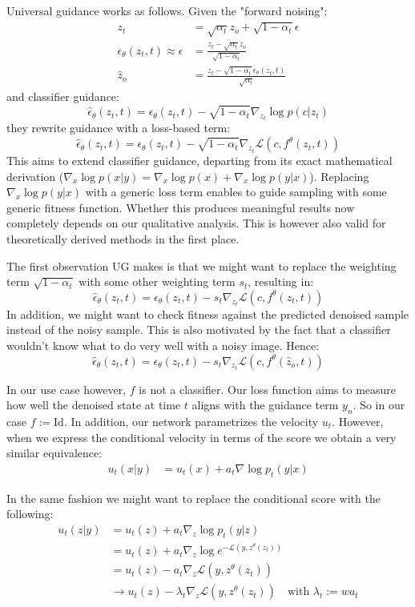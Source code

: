 \documentclass[a4paper,12pt]{article}
\begin{document}
Universal guidance works as follows.
Given the "forward noising":
\begin{align*}
    z_t &= \sqrt{\alpha_t} z_o + \sqrt{1-\alpha_t}\epsilon \\
    \epsilon_\theta(z_t, t) \approx \epsilon &= \frac{z_t - \sqrt{\alpha_t}z_o}{\sqrt{1-\alpha_t}}
    \\
    \hat{z}_o &= \frac{z_t - \sqrt{1-\alpha_t}\epsilon_\theta(z_t, t)}{\sqrt{\alpha_t}} 
\end{align*}
and classifier guidance:
$$
\hat{\epsilon}_\theta(z_t, t) = \epsilon_\theta(z_t, t) - \sqrt{1-\alpha_t}\nabla_{z_t}\log p(c|z_t)
$$
they rewrite guidance with a loss-based term:
$$
\hat{\epsilon}_\theta(z_t, t) = \epsilon_\theta(z_t, t) - \sqrt{1-\alpha_t}\nabla_{z_t}\mathcal{L}(c, f^\theta(z_t, t))
$$
This aims to extend classifier guidance, departing from its exact mathematical derivation ($\nabla_x \log p(x|y) = \nabla_x \log p(x) + \nabla_x \log p(y|x)$).
Replacing $\nabla_x \log p(y|x)$ with a generic loss term enables to guide sampling with some generic fitness function. Whether this produces meaningful results now completely depends on our qualitative analysis. This is however also valid for theoretically derived methods in the first place. 

The first observation UG makes is that we might want to replace the weighting term $\sqrt{1-\alpha_t}$ with some other weighting term $s_t$, resulting in:
$$
\hat{\epsilon}_\theta(z_t, t) = \epsilon_\theta(z_t, t) - s_t\nabla_{z_t}\mathcal{L}(c, f^\theta(z_t, t))
$$
In addition, we might want to check fitness against the predicted denoised sample instead of the noisy sample. This is also motivated by the fact that a classifier wouldn't know what to do very well with a noisy image.
Hence:
$$
\hat{\epsilon}_\theta(z_t, t) = \epsilon_\theta(z_t, t) - s_t\nabla_{z_t}\mathcal{L}(c, f^\theta(\hat{z}_o, t))
$$

In our use case however, $f$ is not a classifier. Our loss function aims to measure how well the denoised state at time $t$ aligns with the guidance term $y_n$. So in our case $f:=\text{Id}$. In addition, our network parametrizes the velocity $u_t$. However, when we express the conditional velocity in terms of the score we obtain a very similar equivalence:
\begin{align*}
    u_t(x|y) &=  u_t(x) + a_t \nabla \log p_t(y|x)
\end{align*}

In the same fashion we might want to replace the conditional score with the following:
\begin{align*}
    u_t(z|y) &=  u_t(z) + a_t \nabla_{z} \log p_t(y|z) \\ &= u_t(z) + a_t \nabla_{z} \log e^{-\mathcal{L}(y, z^\theta(z_t))} \\
    &= u_t(z) - a_t \nabla_{z}\mathcal{L}(y, z^\theta(z_t)) \\
    & \rightarrow u_t(z) - \lambda_t \nabla_{z}\mathcal{L}(y, z^\theta(z_t)) \quad \text{with } \lambda_t := wa_t 
\end{align*}
\end{document}
